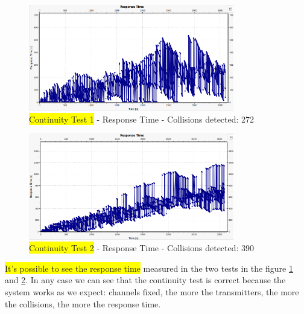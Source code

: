 \begin{figure}[H]
	\centering
	\includegraphics[width=0.8\textwidth]{img/continuityTest1a_responsetime.png}
	\caption{\colorbox{yellow}{Continuity Test 1} - Response Time - Collisions detected: 272}
	\label {img: continuityTest1a_responsetime}
\end{figure}

\begin{figure}[H]
	\centering
	\includegraphics[width=0.8\textwidth]{img/continuityTest1b_responsetime.png}
	\caption{\colorbox{yellow}{Continuity Test 2} - Response Time - Collisions detected: 390}
	\label {img: continuityTest1b_responsetime}
\end{figure}

\noindent \colorbox{yellow}{It's possible to see the response time} measured in the two tests in the figure \ref{img: continuityTest1a_responsetime} and \ref{img: continuityTest1b_responsetime}. In any case we can see that the continuity test is correct because the system works as we expect: channels fixed, the more the transmitters, the more the collisions, the more the response time.

